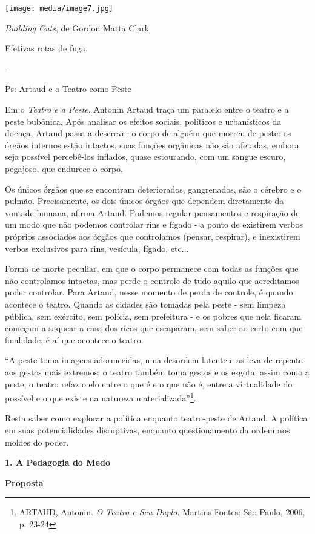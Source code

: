\texttt{[image: media/image7.jpg]}

\emph{Building Cuts}, de Gordon Matta Clark

Efetivas rotas de fuga.

-

Ps: Artaud e o Teatro como Peste

Em o \emph{Teatro e a Peste}, Antonin Artaud traça um paralelo entre o
teatro e a peste bubônica. Após analisar os efeitos sociais, políticos e
urbanísticos da doença, Artaud passa a descrever o corpo de alguém que
morreu de peste: os órgãos internos estão intactos, suas funções
orgânicas não são afetadas, embora seja possível percebê-los inflados,
quase estourando, com um sangue escuro, pegajoso, que endurece o corpo.

Os únicos órgãos que se encontram deteriorados, gangrenados, são o
cérebro e o pulmão. Precisamente, os dois únicos órgãos que dependem
diretamente da vontade humana, afirma Artaud. Podemos regular
pensamentos e respiração de um modo que não podemos controlar rins e
fígado - a ponto de existirem verbos próprios associados aos órgãos que
controlamos (pensar, respirar), e inexistirem verbos exclusivos para
rins, vesícula, fígado, etc...

Forma de morte peculiar, em que o corpo permanece com todas as funções
que não controlamos intactas, mas perde o controle de tudo aquilo que
acreditamos poder controlar. Para Artaud, nesse momento de perda de
controle, é quando acontece o teatro. Quando as cidades são tomadas pela
peste - sem limpeza pública, sem exército, sem polícia, sem prefeitura -
e os pobres que nela ficaram começam a saquear a casa dos ricos que
escaparam, sem saber ao certo com que finalidade; é aí que acontece o
teatro.

``A peste toma imagens adormecidas, uma desordem latente e as leva de
repente aos gestos mais extremos; o teatro também toma gestos e os
esgota: assim como a peste, o teatro refaz o elo entre o que é e o que
não é, entre a virtualidade do possível e o que existe na natureza
materializada''\footnote{ARTAUD, Antonin. \emph{O Teatro e Seu Duplo}.
  Martins Fontes: São Paulo, 2006, p. 23-24}.

Resta saber como explorar a política enquanto teatro-peste de Artaud. A
política em suas potencialidades disruptivas, enquanto questionamento da
ordem nos moldes do poder.

\textbf{1. A Pedagogia do Medo}

\textbf{Proposta}

